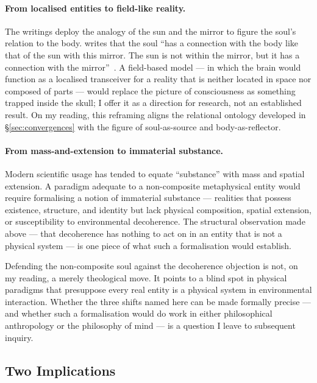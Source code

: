 \paragraph{From localised entities to field-like reality.}
The \bahai writings deploy the analogy of the sun and the mirror to figure
the soul's relation to the body.
\AbdulBaha writes that the soul ``has a connection with the body like that of
the sun with this mirror.
The sun is not within the mirror, but it has a connection with the
mirror''~\citep[Ch. 68]{SAQ}.
A field-based model --- in which the brain would function as a localised
transceiver for a reality that is neither located in space nor composed of
parts --- would replace the picture
of consciousness as something trapped inside the skull; I offer it as a
direction for research, not an established result.
On my reading, this reframing aligns the relational ontology developed in
\S\ref{sec:convergences} with the \bahai figure of soul-as-source and
body-as-reflector.

\paragraph{From mass-and-extension to immaterial substance.}
Modern scientific usage has tended to equate ``substance'' with mass and
spatial extension.
A paradigm adequate to a non-composite metaphysical entity would require
formalising a notion of immaterial substance --- realities that possess
existence, structure, and identity but lack physical composition, spatial
extension, or susceptibility to environmental decoherence.
The structural observation made above --- that decoherence has nothing to act
on in an entity that is not a physical system --- is one piece of what such a
formalisation would establish.

Defending the non-composite soul against the decoherence objection is not,
on my reading, a merely theological move.
It points to a blind spot in physical paradigms that presuppose every real
entity is a physical system in environmental interaction.
Whether the three shifts named here can be made formally precise --- and
whether such a formalisation would do work in either \bahai philosophical
anthropology or the philosophy of mind --- is a question I leave to
subsequent inquiry.

\subsection{Two Implications}

